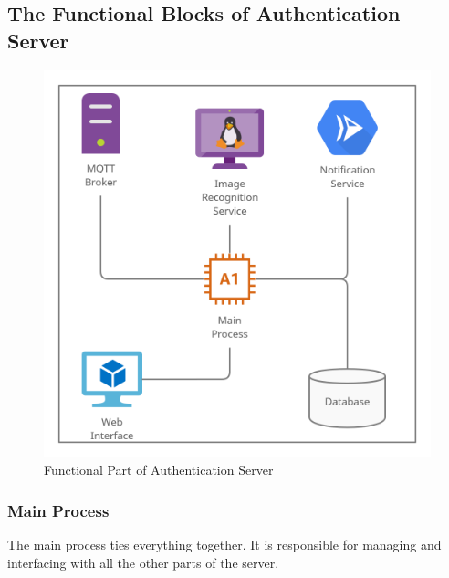     \subsection{The Functional Blocks of Authentication Server}
    \begin{figure}[H]
        \centering
        \includegraphics[width=14cm]{images/auth_server.png}
        \caption{Functional Part of Authentication Server}
    \end{figure}
        \subsubsection{Main Process}
        \begin{flushleft}
            The main process ties everything together. It is responsible for managing and interfacing with all the other parts of
            the server.
        \end{flushleft}

